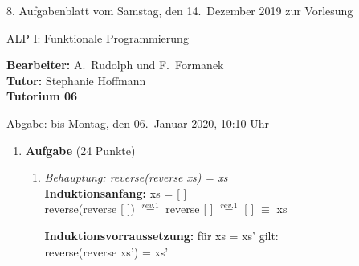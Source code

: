 \documentclass[11pt]{article}
\newcommand{\VORLESUNG}{ALP I: Funktionale Programmierung}
\newcommand{\STAFF}{A.\ Rudolph und F.\ Formanek}
\newcommand{\ASSIGNMENT}{8}
\newcommand{\HANDOUT}{Samstag, den 14.\ Dezember   2019}
\newcommand{\TUTOR}{Stephanie Hoffmann}
\newcommand{\DELIVER}{bis Montag, den 06.\ Januar 2020, 10:10 Uhr}
\newcommand{\punkte}[1]{{\small{ }(#1 Punkte)}}
\newcommand{\aufgabe}[1]{\item{\bf #1}}
\begin{document}
\begin{center}
\ASSIGNMENT{}. Aufgabenblatt vom \HANDOUT{} zur Vorlesung 
\vspace*{0.5cm}

{\Large \VORLESUNG{}}

\textbf{Bearbeiter:} \STAFF{}\\
\textbf{Tutor:} \TUTOR\\
\textbf{Tutorium 06}
\vspace*{0.5cm}

{\small Abgabe: \DELIVER{}}
\vspace*{1cm}
\end{center}
\begin{enumerate}
 \aufgabe{Aufgabe}\punkte{24}
\begin{enumerate}
\item
\textit{Behauptung: reverse(reverse xs) = xs}\\
\vspace*{0.5cm}
\textbf{Induktionsanfang:} xs = [ ]\\
reverse(reverse [ ]) $\stackrel{rev.1}{=}$ reverse [ ] $\stackrel{rev.1}{=}$ [ ] $\equiv$ xs

\vspace*{0.5cm}
\textbf{Induktionsvorraussetzung:} für xs = xs' gilt:\\
reverse(reverse xs') = xs'


\end{enumerate}
\end{enumerate}
\end{document}
